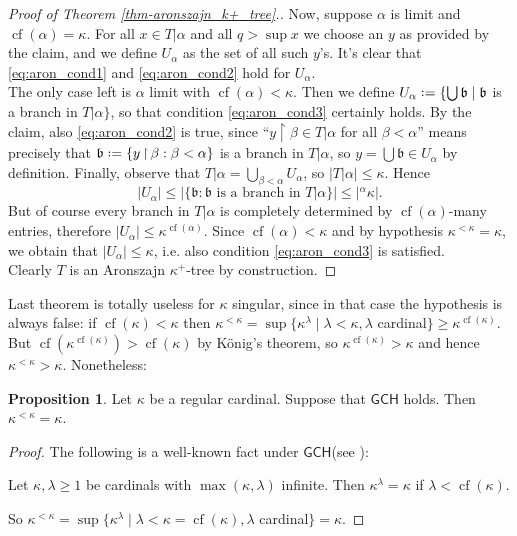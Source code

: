 \documentclass[12pt,a4paper]{report}
\theoremstyle{definition}
\newtheorem{proposition}[theorem]{Proposition}
\theoremstyle{num.custom-title}
\DeclareMathOperator{\restr}{\upharpoonright}
\DeclareMathOperator{\cf}{cf}
\newcommand{\GCH}{\ensuremath{\mathsf{GCH}}\xspace}
\newcommand*{\defeq}{\mathrel{\rlap{%
                     \raisebox{0.3ex}{$\cdot$}}%
                     \raisebox{-0.3ex}{$\cdot$}}%
                     =}
\begin{document}
\begin{proof}[Proof of Theorem \ref{thm-aronszajn_k+_tree}.]
Now, suppose $\alpha$ is limit and $\cf(\alpha) = \kappa$. For all $x \in T|\alpha$ and all $q > \sup x$ we choose an $y$ as provided by the claim, and we define $U_\alpha$ as the set of all such $y$'s. It's clear that \eqref{eq:aron_cond1} and \eqref{eq:aron_cond2} hold for $U_\alpha$.\\
The only case left is $\alpha$ limit with $\cf(\alpha) < \kappa$. Then we define $U_\alpha \defeq \{\bigcup \mathfrak{b} \mid \mathfrak{b}$ is a branch in $T|\alpha \}$, so that condition \eqref{eq:aron_cond3} certainly holds. By the claim, also \eqref{eq:aron_cond2} is true, since ``$y \restr \beta \in T|\alpha$ for all $\beta<\alpha$'' means precisely that $\mathfrak{b} \defeq \{y \restr \beta : \beta < \alpha\}$ is a branch in $T|\alpha$, so $y = \bigcup \mathfrak{b} \in U_\alpha$ by definition. Finally, observe that $T|\alpha = \bigcup_{\beta < \alpha} U_\alpha$, so $|T|\alpha| \leq \kappa$. Hence
\[
|U_\alpha| \leq |\{\mathfrak{b} : \mathfrak{b} \text{ is a branch in } T|\alpha\}| \leq |{}^\alpha \kappa|.
\]
But of course every branch in $T|\alpha$ is completely determined by $\cf(\alpha)$-many entries, therefore $|U_\alpha| \leq \kappa^{\cf(\alpha)}$. Since $\cf(\alpha)<\kappa$ and by hypothesis $\kappa^{<\kappa}=\kappa$, we obtain that $|U_\alpha| \leq \kappa$, i.e. also condition \eqref{eq:aron_cond3} is satisfied.\\[6pt]
Clearly $T$ is an Aronszajn $\kappa^+$-tree by construction.
\end{proof}

Last theorem is totally useless for $\kappa$ singular, since in that case the hypothesis is always false: if $\cf(\kappa)<\kappa$ then $\kappa^{<\kappa} = \sup\{\kappa^\lambda \mid \lambda < \kappa, \lambda$ cardinal$\} \geq \kappa^{\cf(\kappa)}$. But $\cf(\kappa^{\cf(\kappa)}) > \cf(\kappa)$ by König's theorem, so $\kappa^{\cf(\kappa)} > \kappa$ and hence $\kappa^{<\kappa} > \kappa$. Nonetheless:

\begin{proposition}
Let $\kappa$ be a regular cardinal. Suppose that \GCH holds. Then $\kappa^{<\kappa} = \kappa$.
\begin{proof}
The following is a well-known fact under \GCH (see \cite{Kun2009}):
\begin{center}
Let $\kappa,\lambda \geq 1$ be cardinals with $\max(\kappa,\lambda)$ infinite. Then $\kappa^\lambda = \kappa$ if $\lambda < \cf(\kappa)$.
\end{center}
So $\kappa^{<\kappa} = \sup\{\kappa^\lambda \mid \lambda < \kappa = \cf(\kappa), \lambda$ cardinal$\} = \kappa$.
\end{proof}
\end{proposition}
\end{document}
